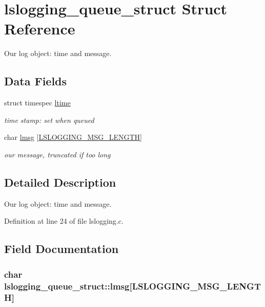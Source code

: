 \hypertarget{structlslogging__queue__struct}{\section{lslogging\-\_\-queue\-\_\-struct Struct Reference}
\label{structlslogging__queue__struct}
}


Our log object\-: time and message.  


\subsection*{Data Fields}
\begin{DoxyCompactItemize}
\item 
struct timespec \hyperlink{structlslogging__queue__struct_aa8211878c89f3c98757c3433115453eb}{ltime}
\begin{DoxyCompactList}\small\item\em time stamp\-: set when queued \end{DoxyCompactList}\item 
char \hyperlink{structlslogging__queue__struct_a5e83db0116b1289a84683ce48626d99d}{lmsg} \mbox{[}\hyperlink{lslogging_8c_a0526e4aa12fbaf357fe315d6b3209c54}{L\-S\-L\-O\-G\-G\-I\-N\-G\-\_\-\-M\-S\-G\-\_\-\-L\-E\-N\-G\-T\-H}\mbox{]}
\begin{DoxyCompactList}\small\item\em our message, truncated if too long \end{DoxyCompactList}\end{DoxyCompactItemize}


\subsection{Detailed Description}
Our log object\-: time and message. 

Definition at line 24 of file lslogging.\-c.



\subsection{Field Documentation}
\hypertarget{structlslogging__queue__struct_a5e83db0116b1289a84683ce48626d99d}{
\subsubsection[{lmsg}]{\setlength{\rightskip}{0pt plus 5cm}char lslogging\-\_\-queue\-\_\-struct\-::lmsg\mbox{[}{\bf L\-S\-L\-O\-G\-G\-I\-N\-G\-\_\-\-M\-S\-G\-\_\-\-L\-E\-N\-G\-T\-H}\mbox{]}}}\label{structlslogging__queue__struct_a5e83db0116b1289a84683ce48626d99d}


